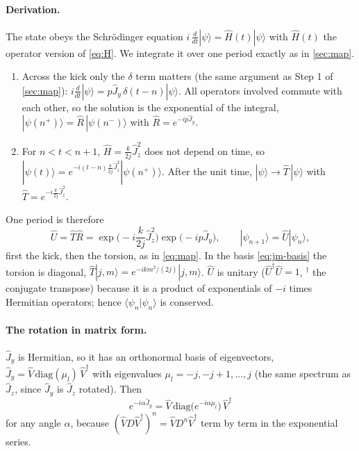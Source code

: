 \documentclass[11pt,a4paper]{article}
\begin{document}
\paragraph{Derivation.} The state obeys the Schrödinger equation $i\,\frac{d}{dt}|\psi\rangle = \hat H(t)|\psi\rangle$
with $\hat H(t)$ the operator version of \eqref{eq:H}. We integrate it over one period exactly as in \cref{sec:map}.
\begin{enumerate}
  \item Across the kick only the $\delta$ term matters (the same argument as Step 1 of \cref{sec:map}):
  $i\frac{d}{dt}|\psi\rangle = p\hat J_y\,\delta(t-n)|\psi\rangle$. All operators involved commute
  with each other, so the solution is the exponential of the integral,
  $|\psi(n^+)\rangle = \hat R\,|\psi(n^-)\rangle$ with $\hat R = e^{-ip\hat J_y}$.
  \item For $n < t < n+1$, $\hat H = \frac{k}{2j}\hat J_z^2$ does not depend on time, so $|\psi(t)\rangle =
  e^{-i(t-n)\frac{k}{2j}\hat J_z^2}|\psi(n^+)\rangle$. After the unit time, $|\psi\rangle \to \hat T\,|\psi\rangle$
  with $\hat T = e^{-i\frac{k}{2j}\hat J_z^2}$.
\end{enumerate}
One period is therefore
\begin{equation}\label{eq:floquet}
  \boxed{\hat U = \hat T\hat R = \exp\!\Big(-i\frac{k}{2j}\hat J_z^2\Big)\exp\!\big(-ip\hat J_y\big), \qquad
  |\psi_{n+1}\rangle = \hat U|\psi_n\rangle ,}
\end{equation}
first the kick, then the torsion, as in \eqref{eq:map}. In the basis \eqref{eq:jm-basis} the torsion is diagonal,
$\hat T|j,m\rangle = e^{-ikm^2/(2j)}|j,m\rangle$. $\hat U$ is unitary ($\hat U^\dagger\hat U = 1$, $^\dagger$ the conjugate
transpose) because it is a product of exponentials of $-i$ times Hermitian operators; hence $\langle\psi_n|\psi_n\rangle$
is conserved.

\paragraph{The rotation in matrix form.} $\hat J_y$ is Hermitian, so it has an orthonormal basis of eigenvectors,
$\hat J_y = \hat V\,\mathrm{diag}(\mu_l)\,\hat V^\dagger$ with eigenvalues $\mu_l = -j, -j+1, \dots, j$ (the same
spectrum as $\hat J_z$, since $\hat J_y$ is $\hat J_z$ rotated). Then
\begin{equation}\label{eq:exp-jy}
  e^{-i\alpha\hat J_y} = \hat V\,\mathrm{diag}\big(e^{-i\alpha\mu_l}\big)\,\hat V^\dagger
\end{equation}
for any angle $\alpha$, because $(\hat V D\hat V^\dagger)^n = \hat V D^n\hat V^\dagger$ term by term in the exponential
series.
\end{document}
